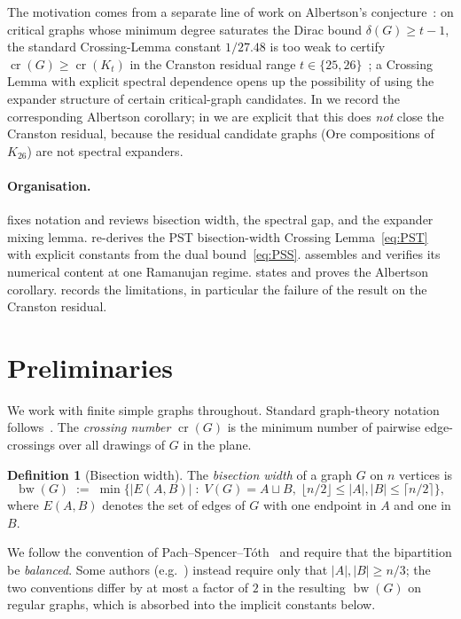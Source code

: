 \documentclass[11pt,a4paper]{article}
\theoremstyle{definition}
\newtheorem{definition}[theorem]{Definition}
\DeclareMathOperator{\crN}{cr}
\DeclareMathOperator{\bw}{bw}
\begin{document}
The motivation comes from a separate line of work on Albertson's
conjecture~\cite{Albertson}: on critical graphs whose minimum
degree saturates the Dirac bound $\delta(G) \ge t - 1$, the
standard Crossing-Lemma constant $1/27.48$ is too weak to certify
$\crN(G) \ge \crN(K_t)$ in the Cranston residual range
$t \in \{25, 26\}$~\cite{Cranston}; a Crossing Lemma with explicit
spectral dependence opens up the possibility of using the
expander structure of certain critical-graph candidates. In
 we record the corresponding Albertson
corollary; in  we are explicit that this
does \emph{not} close the Cranston residual, because the residual
candidate graphs (Ore compositions of $K_{26}$) are not spectral
expanders.

\paragraph{Organisation.}
 fixes notation and reviews bisection width, the
spectral gap, and the expander mixing lemma. 
re-derives the PST bisection-width Crossing Lemma~\eqref{eq:PST}
with explicit constants from the dual bound~\eqref{eq:PSS}.
 assembles  and verifies its
numerical content at one Ramanujan regime. 
states and proves the Albertson corollary. 
records the limitations, in particular the failure of the result on
the Cranston residual.

\section{Preliminaries}\label{sec:prelim}

We work with finite simple graphs throughout. Standard graph-theory
notation follows~\cite{Diestel}. The \emph{crossing number}
$\crN(G)$ is the minimum number of pairwise edge-crossings over
all drawings of $G$ in the plane.

\begin{definition}[Bisection width]\label{def:bw}
The \emph{bisection width} of a graph $G$ on $n$ vertices is
\[
   \bw(G) \;:=\; \min \bigl\{ |E(A, B)| \;:\;
     V(G) = A \sqcup B,\; \lfloor n/2 \rfloor \le |A|, |B|
     \le \lceil n/2 \rceil \bigr\},
\]
where $E(A, B)$ denotes the set of edges of $G$ with one endpoint
in $A$ and one in $B$.
\end{definition}

We follow the convention of Pach--Spencer--T\'oth~\cite{PachSpencerToth}
and require that the bipartition be \emph{balanced}. Some
authors (e.g.~\cite{LeightonRao}) instead require only that
$|A|, |B| \ge n/3$; the two conventions differ by at most a factor
of $2$ in the resulting $\bw(G)$ on regular graphs, which is
absorbed into the implicit constants below.
\end{document}
